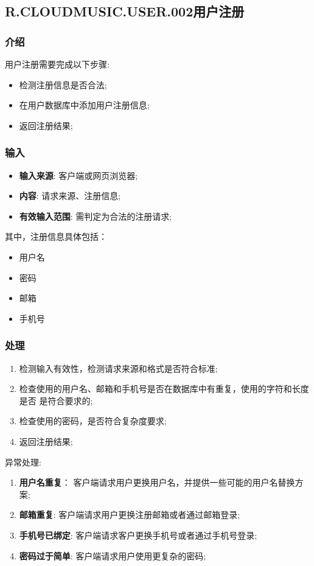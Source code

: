\subsection{R.CLOUDMUSIC.USER.002用户注册}
\subsubsection{介绍}
用户注册需要完成以下步骤:
	\begin{itemize}
		\item 检测注册信息是否合法;
		\item 在用户数据库中添加用户注册信息;
		\item 返回注册结果;
	\end{itemize}
\subsubsection{输入}
	\begin{itemize}
		\item \textbf{输入来源}: 客户端或网页浏览器;
		\item \textbf{内容}: 请求来源、注册信息;
		\item \textbf{有效输入范围}: 需判定为合法的注册请求;
	\end{itemize}
	\noindent 其中，注册信息具体包括：
	\begin{itemize}
		\item 用户名 
		\item 密码
		\item 邮箱
    \item 手机号
	\end{itemize}
\subsubsection{处理}
	\begin{enumerate}
		\item 检测输入有效性，检测请求来源和格式是否符合标准;
		\item 检查使用的用户名、邮箱和手机号是否在数据库中有重复，使用的字符和长度是否
			是符合要求的;
		\item 检查使用的密码，是否符合复杂度要求;
		\item 返回注册结果;
	\end{enumerate}
	\noindent 异常处理: 
	\begin{enumerate}
		\item \textbf{用户名重复}：
		  客户端请求用户更换用户名，并提供一些可能的用户名替换方案;
    \item \textbf{邮箱重复}:
      客户端请求用户更换注册邮箱或者通过邮箱登录;
    \item \textbf{手机号已绑定}:
      客户端请求客户更换手机号或者通过手机号登录;
		\item \textbf{密码过于简单}:
      客户端请求用户使用更复杂的密码;
	\end{enumerate}
